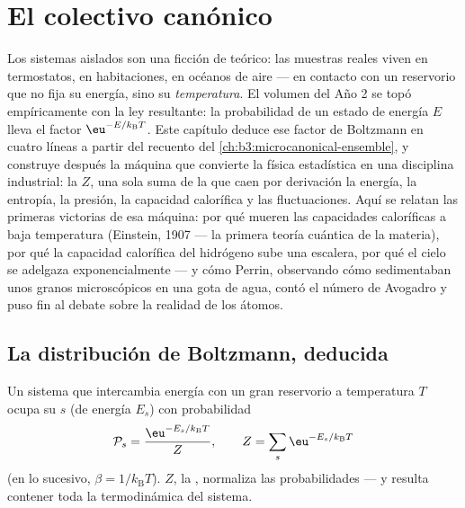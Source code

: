 \chapter{El colectivo canónico}\label{ch:b3:canonical-ensemble}

Los sistemas aislados son una ficción de teórico: las muestras reales viven
en termostatos, en habitaciones, en océanos de aire --- en contacto con un
reservorio que no fija su energía, sino su \emph{temperatura}. El volumen
del Año 2 se topó empíricamente con la ley resultante: la probabilidad de un
estado de energía $E$ lleva el factor $\eu^{-E/k_{\text{B}}T}$. Este
capítulo deduce ese factor de Boltzmann en cuatro líneas a partir del
recuento del \cref{ch:b3:microcanonical-ensemble}, y construye después la
máquina que convierte la física estadística en una disciplina industrial: la
\emph{} $Z$, una sola suma de la que caen por
derivación la energía, la entropía, la presión, la capacidad calorífica y
las fluctuaciones. Aquí se relatan las primeras victorias de esa máquina:
por qué mueren las capacidades caloríficas a baja temperatura (Einstein,
1907 --- la primera teoría cuántica de la materia), por qué la capacidad
calorífica del hidrógeno sube una escalera, por qué el cielo se adelgaza
exponencialmente --- y cómo Perrin, observando cómo sedimentaban unos granos
microscópicos en una gota de agua, contó el número de Avogadro y puso fin al
debate sobre la realidad de los átomos.

\section{La distribución de Boltzmann, deducida}

\begin{theorem}\label{thm:b3:canonical-ensemble:boltzmann}
Un sistema que intercambia energía con un gran reservorio a temperatura $T$
ocupa su  $s$ (de energía $E_s$) con probabilidad
\[
\mathcal P_s = \frac{\eu^{-E_s/k_{\text{B}}T}}{Z} , \qquad
Z = \sum_s \eu^{-E_s/k_{\text{B}}T}
\]
(en lo sucesivo, $\beta = 1/k_{\text{B}}T$). $Z$, la \emph{}, normaliza las probabilidades --- y resulta contener
toda la termodinámica del sistema.
\end{theorem}

